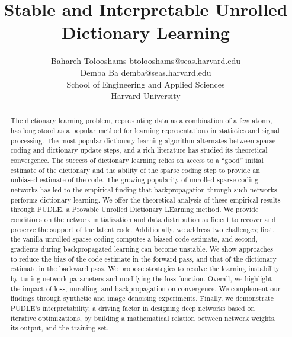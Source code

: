 \documentclass[10pt]{article} %
\title{Stable and Interpretable Unrolled Dictionary Learning}
\author{\name Bahareh Tolooshams \email btolooshams@seas.harvard.edu \\
       \name Demba Ba \email demba@seas.harvard.edu \\
       \addr School of Engineering and Applied Sciences\\
       Harvard University
       }
\begin{document}
\maketitle
\begin{abstract}
The dictionary learning problem, representing data as a combination of a few atoms, has long stood as a popular method for learning representations in statistics and signal processing. The most popular dictionary learning algorithm alternates between sparse coding and dictionary update steps, and a rich literature has studied its theoretical convergence. The success of dictionary learning relies on access to a ``good'' initial estimate of the dictionary and the ability of the sparse coding step to provide an unbiased estimate of the code. The growing popularity of unrolled sparse coding networks has led to the empirical finding that backpropagation through such networks performs dictionary learning. We offer the theoretical analysis of these empirical results through PUDLE, a Provable Unrolled Dictionary LEarning method. We provide conditions on the network initialization and data distribution sufficient to recover and preserve the support of the latent code. Additionally, we address two challenges; first, the vanilla unrolled sparse coding computes a biased code estimate, and second, gradients during backpropagated learning can become unstable. We show approaches to reduce the bias of the code estimate in the forward pass, and that of the dictionary estimate in the backward pass. We propose strategies to resolve the learning instability by tuning network parameters and modifying the loss function. Overall, we highlight the impact of loss, unrolling, and backpropagation on convergence. We complement our findings through synthetic and image denoising experiments. Finally, we demonstrate PUDLE's interpretability, a driving factor in designing deep networks based on iterative optimizations, by building a mathematical relation between network weights, its output, and the training set.
\end{abstract}
%
\end{document}
